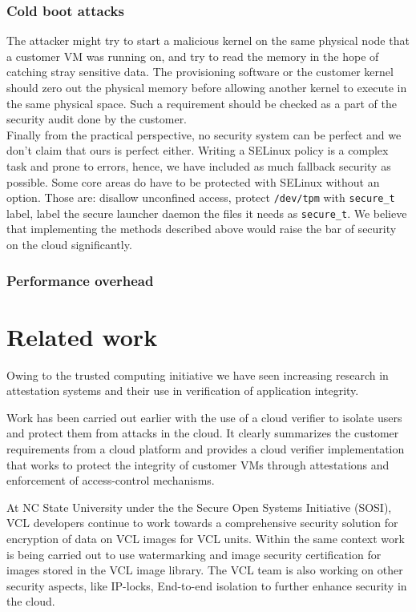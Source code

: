 \documentclass[10pt,twocolumn,pdftex]{article}
\begin{document}
\subsubsection{Cold boot attacks}
The attacker might try to start a malicious kernel on the same physical node that a customer VM was running on, and try to read the memory in the hope of catching stray sensitive data. The provisioning software or the customer kernel should zero out the physical memory before allowing another kernel to execute in the same physical space. Such a requirement should be checked as a part of the security audit done by the customer. 
\\

Finally from the practical perspective, no security system can be perfect and we don't claim that ours is perfect either. Writing a SELinux policy is a complex task and prone to errors, hence, we have included as much fallback security as possible. Some core areas do have to be protected with SELinux without an option. Those are: disallow unconfined access, protect {\tt /dev/tpm} with {\tt secure\_t} label, label the secure launcher daemon the files it needs as {\tt secure\_t}. We believe that implementing the methods described above would raise the bar of security on the cloud significantly.

\subsubsection{Performance overhead}

\section{Related work}
Owing to the trusted computing initiative we have seen increasing research in attestation systems \cite{springerlink:10.1007/s10207-011-0124-7} and their use in verification of application integrity. 

Work has been carried out earlier with the use of a cloud verifier \cite{seeding-clouds-with-trust-anchors} to isolate users and protect them from attacks in the cloud. It clearly summarizes the customer requirements from a cloud platform and provides a cloud verifier implementation that works to protect the integrity of customer VMs through attestations and enforcement of access-control mechanisms. 

At NC State University under the the Secure Open Systems Initiative (SOSI), VCL developers continue to work towards a comprehensive security solution for encryption of data on VCL images for VCL units. Within the same context work is being carried out to use watermarking and image security certification for images stored in the VCL image library. The VCL team is also working on other security aspects, like IP-locks, End-to-end isolation to further enhance security in the cloud.
\end{document}
